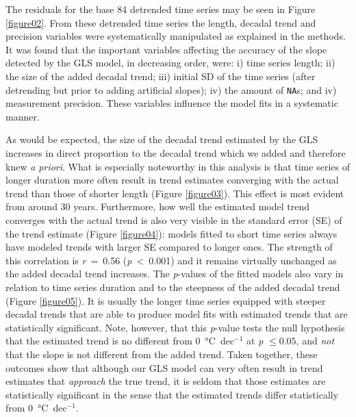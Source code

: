 \documentclass[twocol]{ametsoc}
\begin{document}
The residuals for the base 84 detrended time series may be seen in Figure \ref{figure02}. From these detrended time series the length, decadal trend and precision variables were systematically manipulated as explained in the methods. It was found that the important variables affecting the accuracy of the slope detected by the GLS model, in decreasing order, were: i) time series length; ii) the size of the added decadal trend; iii) initial SD of the time series (after detrending but prior to adding artificial slopes); iv) the amount of \texttt{NA}s; and iv) measurement precision. These variables influence the model fits in a systematic manner.

As would be expected, the size of the decadal trend estimated by the GLS increases in direct proportion to the decadal trend which we added and therefore knew \emph{a priori}. What is especially noteworthy in this analysis is that time series of longer duration more often result in trend estimates converging with the actual trend than those of shorter length (Figure \ref{figure03}). This effect is most evident from around 30 years. Furthermore, how well the estimated model trend converges with the actual trend is also very visible in the standard error (SE) of the trend estimate (Figure \ref{figure04}): models fitted to short time series always have modeled trends with larger SE compared to longer ones. The strength of this correlation is \emph{r}~=~0.56 (\emph{p}~\textless~0.001) and it remains virtually unchanged as the added decadal trend increases. The \emph{p}-values of the fitted models also vary in relation to time series duration and to the steepness of the added decadal trend (Figure \ref{figure05}). It is usually the longer time series equipped with steeper decadal trends that are able to produce model fits with estimated trends that are statistically significant. Note, however, that this \emph{p}-value tests the null hypothesis that the estimated trend is no different from \SI{0}{\degreeCelsius}~dec$^{-1}$ at \emph{p} $\leq 0.05$, and \emph{not} that the slope is not different from the added trend. Taken together, these outcomes show that although our GLS model can very often result in trend estimates that \emph{approach} the true trend, it is seldom that those estimates are statistically significant in the sense that the estimated trends differ statistically from \SI{0}{\degreeCelsius}~dec$^{-1}$.
\end{document}

